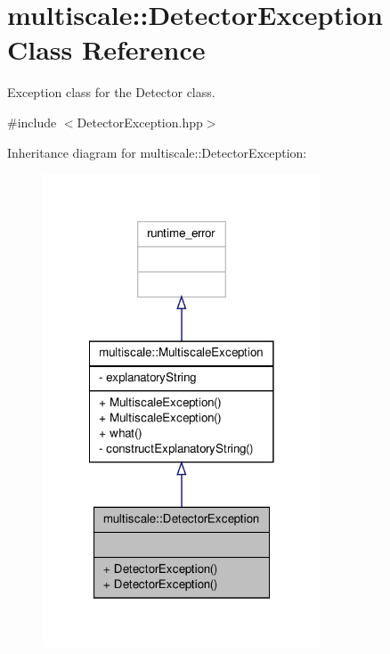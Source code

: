\hypertarget{classmultiscale_1_1DetectorException}{\section{multiscale\-:\-:Detector\-Exception Class Reference}
\label{classmultiscale_1_1DetectorException}
}


Exception class for the Detector class.  




{\ttfamily \#include $<$Detector\-Exception.\-hpp$>$}



Inheritance diagram for multiscale\-:\-:Detector\-Exception\-:\nopagebreak
\begin{figure}[H]
\begin{center}
\leavevmode
\includegraphics[width=234pt]{classmultiscale_1_1DetectorException__inherit__graph}
\end{center}
\end{figure}


